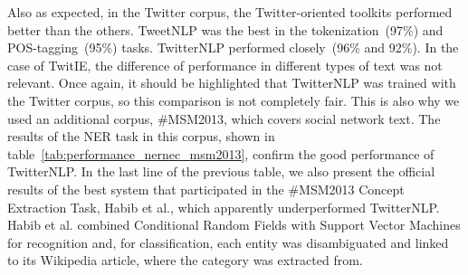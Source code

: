Also as expected, in the Twitter corpus, the Twitter-oriented toolkits performed better than the others. TweetNLP was the best in the tokenization~(97\%) and POS-tagging~(95\%) tasks.
TwitterNLP performed closely~(96\% and 92\%). In the case of TwitIE, the difference of performance in different types of text was not relevant.
Once again, it should be highlighted that TwitterNLP was trained with the Twitter corpus, so this comparison is not completely fair.
This is also why we used an additional corpus, \#MSM2013, which covers social network text.
The results of the NER task in this corpus, shown in table~\ref{tab:performance_nernec_msm2013}, confirm the good performance of TwitterNLP.
In the last line of the previous table, we also present the official results of the best system that participated in the \#MSM2013 Concept Extraction Task, Habib et al.\citep{habibCE2013}, which apparently underperformed TwitterNLP.
Habib et al. combined Conditional Random Fields with Support Vector Machines for recognition and, for classification, each entity was disambiguated and linked to its Wikipedia article, where the category was extracted from.

\begin{table}[H]
\centering
{}
\caption[NEC/NER Performance Results on the \#MSM2013 Data set]{NER/NEC Performance Results on the \#MSM2013 Data set}
\label{tab:performance_nernec_msm2013}
\end{table}

